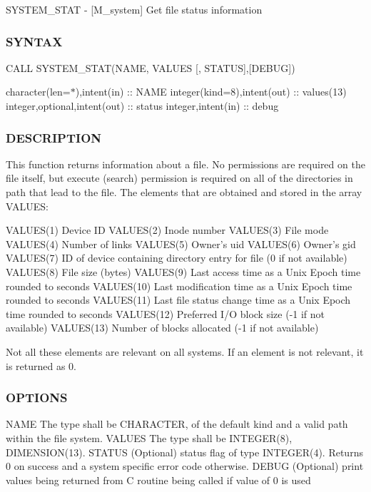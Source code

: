 S\+Y\+S\+T\+E\+M\+\_\+\+S\+T\+AT -\/ \mbox{[}M\+\_\+system\mbox{]} Get file status information 

\subsubsection*{S\+Y\+N\+T\+AX}

C\+A\+LL S\+Y\+S\+T\+E\+M\+\_\+\+S\+T\+A\+T(\+N\+A\+M\+E, V\+A\+L\+U\+E\+S \mbox{[}, S\+T\+A\+T\+U\+S\mbox{]},\mbox{[}\+D\+E\+B\+U\+G\mbox{]})

character(len=$\ast$),intent(in) \+:\+: N\+A\+ME integer(kind=8),intent(out) \+:\+: values(13) integer,optional,intent(out) \+:\+: status integer,intent(in) \+:\+: debug

\subsubsection*{D\+E\+S\+C\+R\+I\+P\+T\+I\+ON}

\begin{DoxyVerb}This function returns information about a file. No permissions are
required on the file itself, but execute (search) permission is required
on all of the directories in path that lead to the file.  The elements
that are obtained and stored in the array VALUES:

   VALUES(1) Device ID
   VALUES(2) Inode number
   VALUES(3) File mode
   VALUES(4) Number of links
   VALUES(5) Owner's uid
   VALUES(6) Owner's gid
   VALUES(7) ID of device containing directory entry for file (0 if not available)
   VALUES(8) File size (bytes)
   VALUES(9) Last access time as a Unix Epoch time rounded to seconds
   VALUES(10) Last modification time as a Unix Epoch time rounded to seconds
   VALUES(11) Last file status change time as a Unix Epoch time rounded to seconds
   VALUES(12) Preferred I/O block size (-1 if not available)
   VALUES(13) Number of blocks allocated (-1 if not available)

Not all these elements are relevant on all systems. If an element is
not relevant, it is returned as 0.
\end{DoxyVerb}


\subsubsection*{O\+P\+T\+I\+O\+NS}

\begin{DoxyVerb}NAME    The type shall be CHARACTER, of the default kind and a valid
        path within the file system.
VALUES  The type shall be INTEGER(8), DIMENSION(13).
STATUS  (Optional) status flag of type INTEGER(4). Returns 0 on success
        and a system specific error code otherwise.
DEBUG   (Optional) print values being returned from C routine being
        called if value of 0 is used
\end{DoxyVerb}


